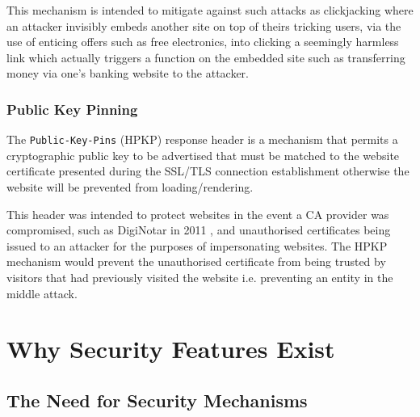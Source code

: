 \documentclass{mscreport}
\begin{document}
\vspace{0.3cm} \noindent
This mechanism is intended to mitigate against such attacks as clickjacking where an attacker invisibly embeds another site on top of theirs tricking users, via the use of enticing offers such as free electronics, into clicking a seemingly harmless link which actually triggers a function on the embedded site such as transferring money via one's banking website to the attacker.


\subsection{Public Key Pinning}
The \texttt{Public-Key-Pins} (HPKP) response header is a mechanism that permits a cryptographic public key to be advertised that must be matched to the website certificate presented during the SSL/TLS connection establishment otherwise the website will be prevented from loading/rendering.

\vspace{0.3cm} \noindent
This header was intended to protect websites in the event a CA provider was compromised, such as DigiNotar in 2011 \cite{Amann2017-co}, and unauthorised certificates being issued to an attacker for the purposes of impersonating websites. The HPKP mechanism would prevent the unauthorised certificate from being trusted by visitors that had previously visited the website i.e. preventing an entity in the middle attack.
\newpage

%

\chapter{Why Security Features Exist}
\label{chap:sec_feat_exist}

\section{The Need for Security Mechanisms}
\label{section:need_for_security_mechanisms}
\end{document}

